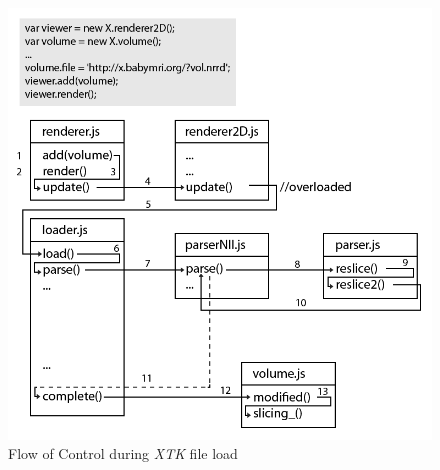 \documentclass[a4paper,11pt,twoside]{article}
\begin{document}
\begin{figure}[ht!]
\centering
\includegraphics[width=140mm]{graphics/XtkFileLoad_01.png}
\caption{Flow of Control during \textit{XTK} file load}
\label{fig:xtkLoad}
\end{figure}
\end{document}
